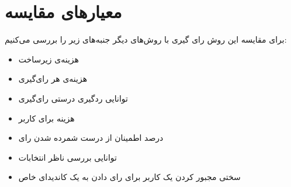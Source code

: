 \section{معیار‌های مقایسه}
برای مقایسه این روش رای گیری با روش‌های دیگر جنبه‌های زیر را بررسی می‌کنیم:
\begin{itemize}
	\item
	هزینه‌ی زیرساخت
	\item
	هزینه‌ی هر رای‌گیری
	\item 
	توانایی ردگیری درستی رای‌گیری
	\item
	هزینه برای کاربر
	\item
	درصد اطمینان از درست شمرده شدن رای 
	\item 
	توانایی بررسی ناظر انتخابات
	\item 
	سختی مجبور کردن یک کاربر برای رای دادن به یک کاندیدای خاص
\end{itemize}

